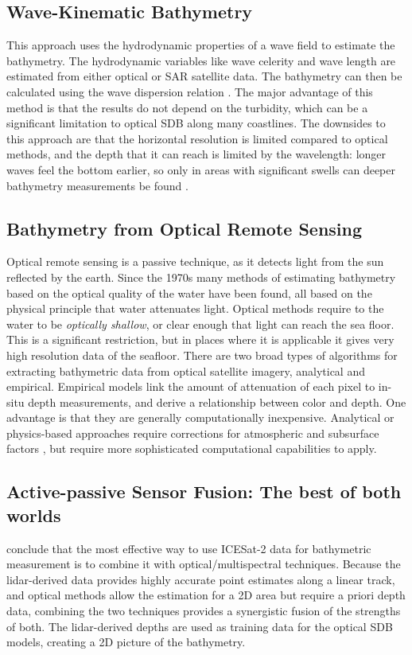 \subsection{Wave-Kinematic Bathymetry}
This approach uses the hydrodynamic properties of a wave field to estimate the bathymetry. The hydrodynamic variables like wave celerity and wave length are estimated from either optical or SAR satellite data. The bathymetry can then be calculated using the wave dispersion relation \cite{Almar2021e}. The major advantage of this method is that the results do not depend on the turbidity, which can be a significant limitation to optical SDB along many coastlines. The downsides to this approach are that the horizontal resolution is limited compared to optical methods, and the depth that it can reach is limited by the wavelength: longer waves feel the bottom earlier, so only in areas with significant swells can deeper bathymetry measurements be found \parencite{Almar2021e}.

\subsection{Bathymetry from Optical Remote Sensing}
Optical remote sensing is a passive technique, as it detects light from the sun reflected by the earth. Since the 1970s many methods of estimating bathymetry based on the optical quality of the water have been found, all based on the physical principle that water attenuates light. Optical methods require to the water to be \emph{optically shallow}, or clear enough that light can reach the sea floor. This is a significant restriction, but in places where it is applicable it gives very high resolution data of the seafloor. There are two broad types of algorithms for extracting bathymetric data from optical satellite imagery, analytical and empirical. Empirical models link the amount of attenuation of each pixel to in-situ depth measurements, and derive a relationship between color and depth. One advantage is that they are generally computationally inexpensive. Analytical or physics-based approaches require corrections for atmospheric and subsurface factors \parencite{Turner2021}, but require more sophisticated computational capabilities to apply.


\subsection{Active-passive Sensor Fusion: The best of both worlds}
\cite{Parrish2019} conclude that the most effective way to use ICESat-2 data for bathymetric measurement is to combine it with optical/multispectral techniques. Because the lidar-derived data provides highly accurate point estimates along a linear track, and optical methods allow the estimation for a 2D area but require a priori depth data, combining the two techniques provides a synergistic fusion of the strengths of both. The lidar-derived depths are used as training data for the optical SDB models, creating a 2D picture of the bathymetry.

